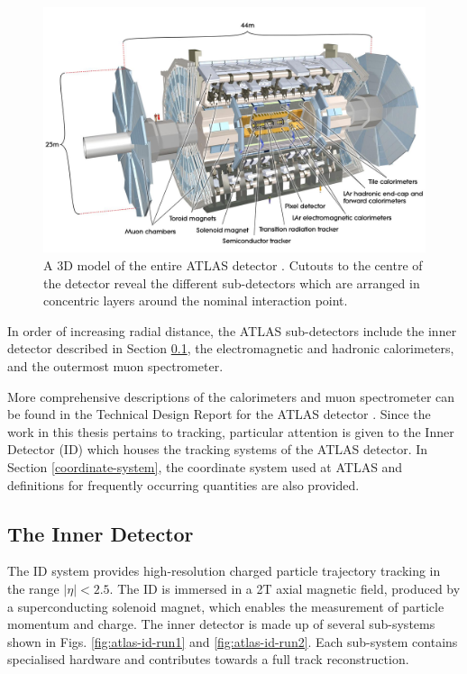 \begin{figure}[htb!]
\includegraphics[width=\textwidth]{images/2-LHC-ATLAS/atlas_detector.jpg}
\caption{A 3D model of the entire ATLAS detector \cite{Jon-And:1237407}. Cutouts to the centre of the detector reveal the different sub-detectors which are arranged in concentric layers around the nominal interaction point.}
\label{fig: atlas-detector}
\end{figure}

In order of increasing radial distance, the ATLAS sub-detectors include the inner detector described in Section \ref{inner-detector}, the electromagnetic and hadronic calorimeters, and the outermost muon spectrometer. 

More comprehensive descriptions of the calorimeters and muon spectrometer can be found in the Technical Design Report for the ATLAS detector \cite{inner-detector-TDR}. Since the work in this thesis pertains to tracking, particular attention is given to the Inner Detector (ID) which houses the tracking systems of the ATLAS detector. In Section \ref{coordinate-system}, the coordinate system used at ATLAS and definitions for frequently occurring quantities are also provided.



\subsection{The Inner Detector}
\label{inner-detector}

The ID system provides high-resolution charged particle trajectory tracking in the range $ \lvert \eta \rvert < 2.5$. The ID is immersed in a 2T axial magnetic field, produced by a superconducting solenoid magnet, which enables the measurement of particle momentum and charge. The inner detector is made up of several sub-systems shown in Figs. \ref{fig:atlas-id-run1} and \ref{fig:atlas-id-run2}. Each sub-system contains specialised hardware and contributes towards a full track reconstruction. 

